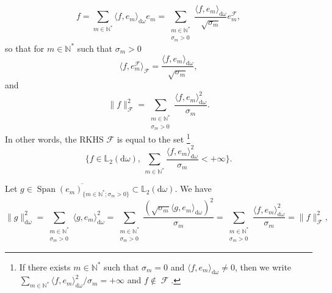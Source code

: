 \documentclass[twoside,11pt]{book}
\numberwithin{theorem}{chapter}
\numberwithin{definition}{chapter}
\numberwithin{proposition}{chapter}
\numberwithin{corollary}{chapter}
\numberwithin{example}{chapter}
\numberwithin{lemma}{chapter}
\numberwithin{assumption}{chapter}
\DeclareMathOperator{\Span}{\mathrm{Span}}
\DeclareMathOperator{\F}{\mathcal{F}}
\begin{document}
\begin{equation}
f  = \sum\limits_{m \in \mathbb{N}^{*}} \langle f, e_m \rangle_{\mathrm{d}\omega} e_m =  \sum\limits_{\substack{m \in \mathbb{N}^{*}\\ \sigma_m >0}} \frac{\langle f, e_m \rangle_{\mathrm{d}\omega}}{\sqrt{\sigma_m}} e_{m}^{\F},
\end{equation}
so that for $m \in \mathbb{N}^{*}$ such that $\sigma_m>0$
\begin{equation}
 \langle f, e_{m}^{\F} \rangle_{\F} = \frac{\langle f,e_m \rangle_{\mathrm{d}\omega}}{\sqrt{\sigma_m}}, 
\end{equation}
and
\begin{equation}\label{eq:rkhs_norm_ltwo_norm}
\|f\|_{\F}^{2} = \sum\limits_{\substack{m \in \mathbb{N}^{*}\\\sigma_m >0}} \frac{\langle f, e_m \rangle_{\mathrm{d}\omega}^{2}}{\sigma_m}.
\end{equation}
In other words, the RKHS $\mathcal{F}$ is equal to the set \footnote{If there exists $m \in \mathbb{N}^{*}$ such that $\sigma_m = 0$ and $\langle f, e_m \rangle_{\mathrm{d}\omega} \neq 0$, then we write $\sum\limits_{m \in \mathbb{N}^{*}} \langle f,e_m \rangle_{\mathrm{d}\omega}^{2}/\sigma_m = +\infty$ and $f \notin \F$.}
\begin{equation}
\bigg \{ f \in \mathbb{L}_{2}(\mathrm{d}\omega), \: \sum\limits_{m \in \mathbb{N}^{*}} \frac{\langle f,e_m \rangle_{\mathrm{d}\omega}^{2}}{\sigma_m} < +\infty \bigg\}.
\end{equation}



Let $g \in \overline{\Span (e_{m})_{\{m \in \mathbb{N}^{*}; \sigma_m>0 \}}} \subset \mathbb{L}_{2}(\mathrm{d}\omega)$. We have
\begin{equation}
\|g\|_{\mathrm{d}\omega}^{2} = \sum\limits_{\substack{m \in \mathbb{N}^{*}\\ \sigma_{m}>0}}\langle g,e_{m}\rangle_{\mathrm{d}\omega}^{2} = \sum\limits_{\substack{m \in \mathbb{N}^{*}\\ \sigma_{m}>0}} \frac{(\sqrt{\sigma_m} \langle g,e_{m}\rangle_{\mathrm{d}\omega})^{2}}{\sigma_{m}}= \sum\limits_{\substack{m \in \mathbb{N}^{*}\\ \sigma_{m}>0}} \frac{ \langle f,e_{m}\rangle_{\mathrm{d}\omega}^{2}}{\sigma_{m}} = \|f\|_{\F}^{2}, 
\end{equation}
\end{document}
